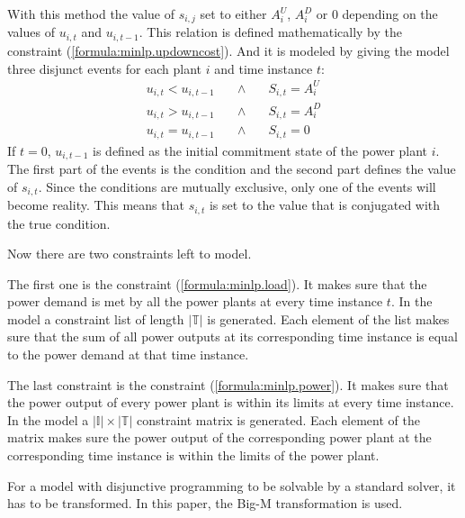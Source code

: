 With this method the value of $s_{i, j}$ set to either $A^U_i$, $A^D_i$ or $0$
depending on the values of $u_{i, t}$ and $u_{i, t-1}$.
This relation is defined mathematically by the constraint (\ref{formula:minlp.updowncost}).
And it is modeled by giving the model three disjunct events for each plant $i$ and time instance $t$:
\begin{subequations}
\begin{align}
  u_{i, t} < u_{i, t-1} \quad & \land & \quad S_{i, t} = A^U_i \\
  u_{i, t} > u_{i, t-1} \quad & \land & \quad S_{i, t} = A^D_i \\
  u_{i, t} = u_{i, t-1} \quad & \land & \quad S_{i, t} = 0
\end{align}
\end{subequations}
If $t = 0$, $u_{i, t-1}$ is defined as the initial commitment state of the power plant $i$.
The first part of the events is the condition and the second part defines the value of $s_{i, t}$.
Since the conditions are mutually exclusive,
only one of the events will become reality.
This means that $s_{i, t}$ is set to the value that is conjugated with the true condition.

Now there are two constraints left to model.

The first one is the constraint (\ref{formula:minlp.load}).
It makes sure that the power demand is met by all the power plants at every time instance $t$.
In the model a constraint list of length $|\mathbb{T}|$ is generated.
Each element of the list makes sure that the sum of all power outputs at its corresponding time instance
is equal to the power demand at that time instance.

The last constraint is the constraint (\ref{formula:minlp.power}).
It makes sure that the power output of every power plant is within its limits at every time instance.
In the model a $|\mathbb{I}| \times |\mathbb{T}|$ constraint matrix is generated.
Each element of the matrix makes sure the power output of the corresponding power plant
at the corresponding time instance is within the limits of the power plant.

For a model with disjunctive programming to be solvable by a standard solver,
it has to be transformed.
In this paper, the Big-M transformation is used.
\cite{Trespalacios2015}
